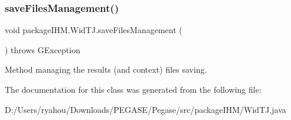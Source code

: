 \subsubsection{\texorpdfstring{save\+Files\+Management()}{saveFilesManagement()}}
{\footnotesize\ttfamily void package\+I\+H\+M.\+Wid\+T\+J.\+save\+Files\+Management (\begin{DoxyParamCaption}{ }\end{DoxyParamCaption}) throws G\+Exception\hspace{0.3cm}{\ttfamily [protected]}}

Method managing the results (and context) files saving. 

The documentation for this class was generated from the following file\+:\begin{DoxyCompactItemize}
\item 
D\+:/\+Users/ryahou/\+Downloads/\+P\+E\+G\+A\+S\+E/\+Pegase/src/package\+I\+H\+M/Wid\+T\+J.\+java\end{DoxyCompactItemize}
